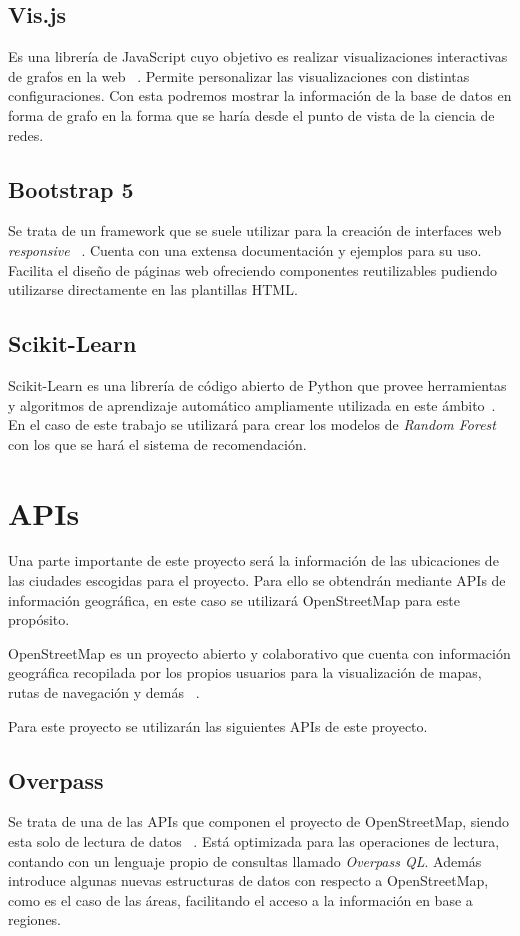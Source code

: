 \subsection{Vis.js}
Es una librería de JavaScript cuyo objetivo es realizar visualizaciones interactivas de grafos en la web ~\cite{visjsVisjs}.
Permite personalizar las visualizaciones con distintas configuraciones. Con esta podremos mostrar
la información de la base de datos en forma de grafo en la forma que se haría desde el punto de vista de la ciencia
de redes.

\subsection{Bootstrap 5}
Se trata de un framework que se suele utilizar para la creación de interfaces web \textit{responsive} ~\cite{Bootstrap}.
Cuenta con una extensa documentación y ejemplos para su uso. Facilita el diseño de páginas web ofreciendo
componentes reutilizables pudiendo utilizarse directamente en las plantillas HTML.

\subsection{Scikit-Learn}
Scikit-Learn es una librería de código abierto de Python que provee herramientas y algoritmos de aprendizaje automático ampliamente utilizada en este ámbito~\cite{scikitlearnAbout}. En el caso de este trabajo se utilizará para crear los modelos de \textit{Random Forest} con los que se hará el sistema de recomendación.


\section{APIs}
Una parte importante de este proyecto será la información de las ubicaciones de las ciudades escogidas
para el proyecto. Para ello se obtendrán mediante APIs de información geográfica, en este caso se utilizará
OpenStreetMap para este propósito. 

OpenStreetMap es un proyecto abierto y colaborativo que cuenta con información geográfica
recopilada por los propios usuarios para la visualización de mapas, rutas de navegación y demás ~\cite{OSM}.

Para este proyecto se utilizarán las siguientes APIs de este proyecto. 

\subsection{Overpass}
Se trata de una de las APIs que componen el proyecto de OpenStreetMap, siendo esta solo de lectura de datos ~\cite{Overpass, openstreetmapOverpassOpenStreetMap}.
Está optimizada para las operaciones de lectura, contando con un lenguaje propio de consultas llamado \textit{Overpass QL}.
Además introduce algunas nuevas estructuras de datos con respecto a OpenStreetMap, como es el caso de las áreas, facilitando el acceso a la información en base a regiones.

